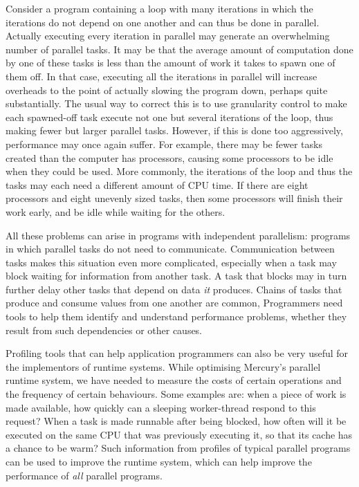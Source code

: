 Consider a program containing a loop with many iterations
in which the iterations do not depend on one another
and can thus be done in parallel.
Actually executing every iteration in parallel
may generate an overwhelming number of parallel tasks.
It may be that the average amount of computation done by one of these tasks
is less than the amount of work it takes to spawn one of them off.
In that case, executing all the iterations in parallel
will increase overheads to the point of actually slowing the program down,
perhaps quite substantially.
The usual way to correct this is to use granularity control
to make each spawned-off task execute
not one but several iterations of the loop,
thus making fewer but larger parallel tasks.
However, if this is done too aggressively,
performance may once again suffer.
For example,
there may be fewer tasks created than the computer has processors,
causing some processors to be idle when they could be used.
More commonly, the iterations of the loop and thus the tasks
may each need a different amount of CPU time.
If there are eight processors and eight unevenly sized tasks,
then some processors will finish their work early,
and be idle while waiting for the others.

All these problems can arise in programs with independent parallelism:
programs in which parallel tasks do not need to communicate.
Communication between tasks makes this situation even more complicated,
especially when a task may block waiting for information from another task.
A task that blocks may in turn further delay
other tasks that depend on data \emph{it} produces.
Chains of tasks that produce and consume values from one another are common,
Programmers need tools to help them
identify and understand performance problems,
whether they result from such dependencies or other causes.

Profiling tools that can help application programmers
can also be very useful for the implementors of runtime systems.
While optimising Mercury's parallel runtime system,
we have needed to measure the costs of certain operations
and the frequency of certain behaviours.
Some examples are:
when a piece of work is made available,
how quickly can a sleeping worker-thread respond to this request?
When a task is made runnable after being blocked,
how often will it be executed on the same CPU that was previously executing it,
so that its cache has a chance to be warm?
Such information from profiles of typical parallel programs
can be used to improve the runtime system,
which can help improve the performance of \emph{all} parallel programs.

